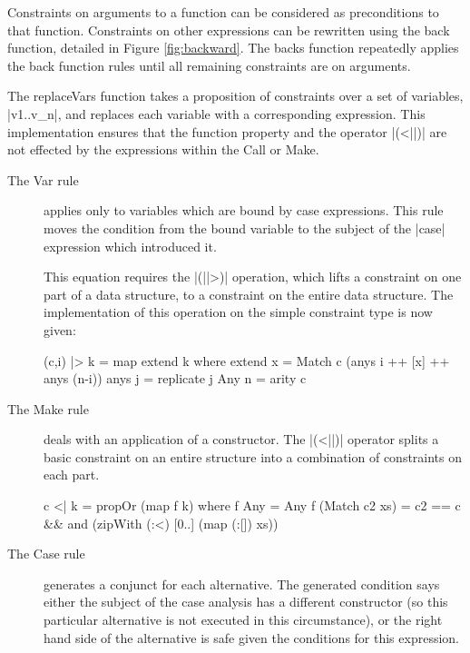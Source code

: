 \documentclass[preprint]{sigplanconf}
\newcommand{\C}[1]{\textsf{#1}}
\begin{document}
Constraints on arguments to a function can be considered as preconditions to that function. Constraints on other expressions can be rewritten using the \C{back} function, detailed in Figure \ref{fig:backward}. The \C{backs} function repeatedly applies the \C{back} function rules until all remaining constraints are on arguments.

The \C{replaceVars} function takes a proposition of constraints over a set of variables, |v1..v_n|, and replaces each variable with a corresponding expression. This implementation ensures that the function \C{property} and the operator |(<||)| are not effected by the expressions within the \C{Call} or \C{Make}.

\begin{description}

\item[The \C{Var} rule] applies only to variables which are bound by case expressions. This rule moves the condition from the bound variable to the subject of the |case| expression which introduced it.

    This equation requires the |(||>)| operation, which lifts a constraint on one part of a data structure, to a constraint on the entire data structure. The implementation of this operation on the simple constraint type is now given:

\begin{code}
(c,i) |> k = map extend k
    where
    extend x = Match c (anys i ++ [x] ++ anys (n-i))
    anys j = replicate j Any
    n = arity c
\end{code}

\item[The \C{Make} rule] deals with an application of a constructor. The |(<||)| operator splits a basic constraint on an entire structure into a combination of constraints on each part.

\begin{code}
c <| k = propOr (map f k)
    where
    f Any = Any
    f (Match c2 xs) = c2 == c &&
        and (zipWith (:<) [0..] (map (:[]) xs))
\end{code}

\item[The \C{Case} rule] generates a conjunct for each alternative. The generated condition says either the subject of the case analysis has a different constructor (so this particular alternative is not executed in this circumstance), or the right hand side of the alternative is safe given the conditions for this expression.


\end{description}
\end{document}
